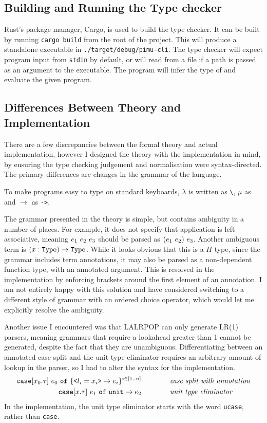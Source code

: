 \documentclass[12pt,a4paper,twoside]{report}
\begin{document}
\subsection{Building and Running the Type checker}

Rust's package manager, Cargo, is used to build the type checker.
It can be built by running \texttt{cargo build} from the root of the project.
This will produce a standalone executable in \texttt{./target/debug/pimu-cli}.
The type checker will expect program input from \texttt{stdin} by default, or will read from a file if a path is passed as an argument to the executable.
The program will infer the type of and evaluate the given program.

\subsection{Differences Between Theory and Implementation}

There are a few discrepancies between the formal theory and actual implementation, however I designed the theory with the implementation in mind, by ensuring the type checking judgement and normalisation were syntax-directed.
The primary differences are changes in the grammar of the language.

To make programs easy to type on standard keyboards, \(\lambda\) is written as \lstinline{\}, \(\mu\) as \texttt{\textapprox} and \(\rightarrow\) as \lstinline{->}.

The grammar presented in the theory is simple, but contains ambiguity in a number of places.
For example, it does not specify that application is left associative, meaning \(e_1\ e_2\ e_3\) should be parsed as \((e_1\ e_2)\ e_3\).
Another ambiguous term is \((x : \mathtt{Type}) \rightarrow \mathtt{Type}\).
While it looks obvious that this is a \(\Pi\) type, since the grammar includes term annotations, it may also be parsed as a non-dependent function type, with an annotated argument.
This is resolved in the implementation by enforcing brackets around the first element of an annotation.
I am not entirely happy with this solution and have considered switching to a different style of grammar with an ordered choice operator, which would let me explicitly resolve the ambiguity.

Another issue I encountered was that LALRPOP can only generate LR(1) parsers, meaning grammars that require a lookahead greater than 1 cannot be generated, despite the fact that they are unambiguous.
Differentiating between an annotated case split and the unit type eliminator requires an arbitrary amount of lookup in the parser, so I had to alter the syntax for the implementation.
\begin{align*}
    \mathtt{case}[x_0.\tau]\ e_0\ \mathtt{of}\ \{\texttt{<} l_i = x_i \texttt{>} \rightarrow e_i\}^{i \in [1 \mathinner{\ldotp \ldotp} n]} \qquad\qquad&\textit{case split with annotation} \\
    \texttt{case}[x.\tau]\ e_1\ \texttt{of}\ \texttt{unit} \rightarrow e_2 \qquad\qquad&\textit{unit type eliminator}
\end{align*}
In the implementation, the unit type eliminator starts with the word \texttt{ucase}, rather than \texttt{case}.
\end{document}

